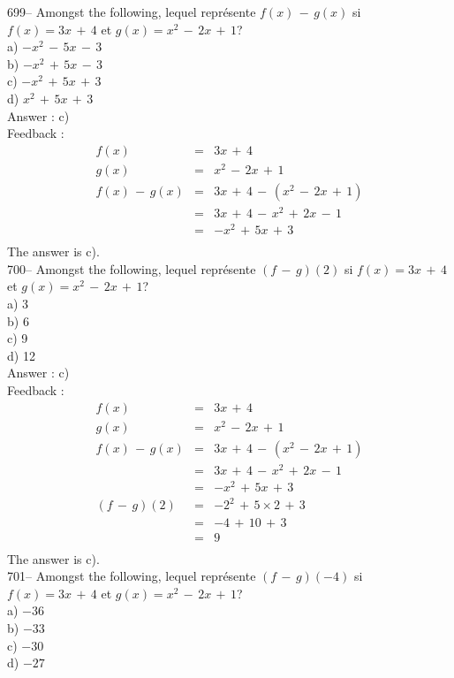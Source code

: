 ﻿\documentclass[letterpaper, 12pt]{article}
\begin{document}
699-- Amongst the following, lequel repr\'esente $f(x)\,-\,g(x)$
si $f(x)=3x\,+\,4$ et $g(x)=x^{2}\,-\,2x\,+\,1$?\\
a) $-x^{2}\,-\,5x\,-\,3$\\
b) $-x^{2}\,+\,5x\,-\,3$\\
c) $-x^{2}\,+\,5x\,+\,3$\\
d) $x^{2}\,+\,5x\,+\,3$\\

Answer : c)\\

Feedback : \\
\begin{eqnarray*}
f(x)&=&3x\,+\,4\\
g(x)&=&x^{2}\,-\,2x\,+\,1\\
f(x)\,-\,g(x)&=&3x\,+\,4\,-\,(x^{2}\,-\,2x\,+\,1)\\
&=&3x\,+\,4\,-\,x^{2}\,+\,2x\,-\,1\\
&=&-x^{2}\,+\,5x\,+\,3\\
\end{eqnarray*}
The answer is c).\\

700-- Amongst the following, lequel repr\'esente $(f\,-\,g)(2)$
si $f(x)=3x\,+\,4$ et $g(x)=x^{2}\,-\,2x\,+\,1$?\\
a) 3\\
b) 6\\
c) 9\\
d) 12\\

Answer : c)\\

Feedback : \\
\begin{eqnarray*}
f(x)&=&3x\,+\,4\\
g(x)&=&x^{2}\,-\,2x\,+\,1\\
f(x)\,-\,g(x)&=&3x\,+\,4\,-\,(x^{2}\,-\,2x\,+\,1)\\
&=&3x\,+\,4\,-\,x^{2}\,+\,2x\,-\,1\\
&=&-x^{2}\,+\,5x\,+\,3\\
(f\,-\,g)(2)&=& - 2^{2}\,+\,5\times2\,+\,3\\
&=&-4\,+\,10\,+\,3\\
&=&9\\
\end{eqnarray*}
The answer is c).\\

701-- Amongst the following, lequel repr\'esente $(f\,-\,g)(-4)$
si $f(x)=3x\,+\,4$ et $g(x)=x^{2}\,-\,2x\,+\,1$?\\
a) $-36$\\
b) $-33$\\
c) $-30$\\
d) $-27$\\
\end{document}
